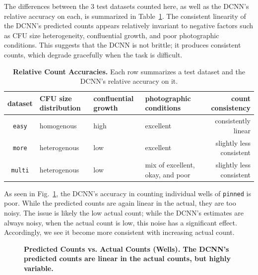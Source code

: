 \documentclass[10pt,letterpaper]{article}
\begin{document}
            The differences between the $3$ test datasets counted here, as well as the DCNN's relative accuracy on each, is summarized in Table~\ref{dcnn_plate_summaries}. The consistent linearity of the DCNN's predicted counts appears relatively invariant to negative factors such as CFU size heterogeneity, confluential growth, and poor photographic conditions. This suggests that the DCNN is not brittle; it produces consistent counts, which degrade gracefully when the task is difficult.
            
            \begin{table}[h]
                \begin{adjustwidth}{-1.5in}{0in}
                    \caption{{\bf Relative Count Accuracies.} Each row summarizes a test dataset and the DCNN's relative accuracy on it.}
                    \begin{tabular}{c|l|l|l|r}
                        dataset & CFU size distribution & confluential growth & photographic conditions & count consistency \\
                        \hline
                        \texttt{easy} & homogenous & high & excellent & consistently linear \\
                        \texttt{more} & heterogenous & low & excellent & slightly less consistent \\
                        \texttt{multi} & heterogenous & low & mix of excellent, okay, and poor & slightly less consistent \\
                        \end{tabular}
                    \label{dcnn_plate_summaries}
                \end{adjustwidth}
            \end{table}  

            As seen in Fig.~\ref{dcnn_well_counts}, the DCNN's accuracy in counting individual wells of \texttt{pinned} is poor. While the predicted counts are again linear in the actual, they are too noisy. The issue is likely the low actual count; while the DCNN's estimates are always noisy, when the actual count is low, this noise has a significant effect. Accordingly, we see it become more consistent with increasing actual count.

            \begin{figure}[h]
                
                \caption{{\bf Predicted Counts vs. Actual Counts (Wells). The DCNN's predicted counts are linear in the actual counts, but highly variable.}}
                \label{dcnn_well_counts}
            \end{figure}
            
\end{document}
